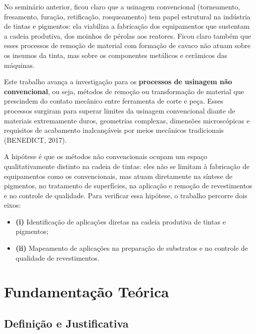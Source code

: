 \documentclass[
  12pt,
  a4paper,
  oneside,
  brazil,
  chapter=TITLE
]{article}
\newcommand{\secbreak}{\clearpage}
\let\oldsection\section
\renewcommand{\section}{\secbreak\oldsection}
\begin{document}
No seminário anterior, ficou claro que a usinagem convencional (torneamento, fresamento, furação, retificação, rosqueamento) tem papel estrutural na indústria de tintas e pigmentos: ela viabiliza a fabricação dos equipamentos que sustentam a cadeia produtiva, dos moinhos de pérolas aos reatores. Ficou claro também que esses processos de remoção de material com formação de cavaco não atuam sobre os insumos da tinta, mas sobre os componentes metálicos e cerâmicos das máquinas.

Este trabalho avança a investigação para os \textbf{processos de usinagem não convencional}, ou seja, métodos de remoção ou transformação de material que prescindem do contato mecânico entre ferramenta de corte e peça. Esses processos surgiram para superar limites da usinagem convencional diante de materiais extremamente duros, geometrias complexas, dimensões microscópicas e requisitos de acabamento inalcançáveis por meios mecânicos tradicionais (BENEDICT, 2017).

A hipótese é que os métodos não convencionais ocupam um espaço qualitativamente distinto na cadeia de tintas: eles não se limitam à fabricação de equipamentos como os convencionais, mas atuam diretamente na síntese de pigmentos, no tratamento de superfícies, na aplicação e remoção de revestimentos e no controle de qualidade. Para verificar essa hipótese, o trabalho percorre dois eixos:

\begin{itemize}
\tightlist
\item \textbf{(i)} Identificação de aplicações diretas na cadeia produtiva de tintas e pigmentos;
\item \textbf{(ii)} Mapeamento de aplicações na preparação de substratos e no controle de qualidade de revestimentos.
\end{itemize}

\section{Fundamentação Teórica}\label{fundamentacao-teorica}

\subsection{Definição e Justificativa}\label{definicao-e-justificativa}
\end{document}

